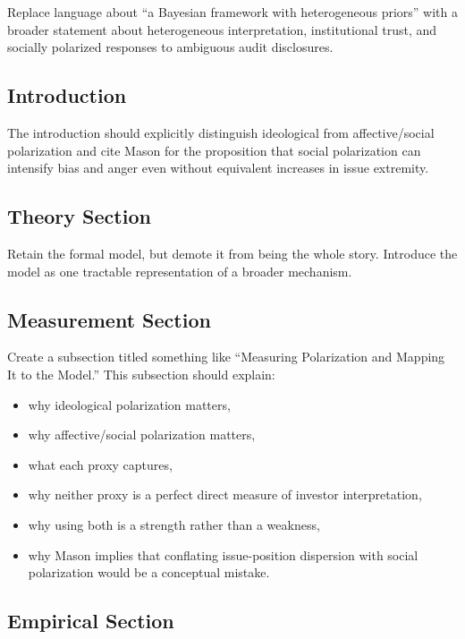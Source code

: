 \documentclass[12pt]{article}
\begin{document}
Replace language about ``a Bayesian framework with heterogeneous priors'' with a broader statement about heterogeneous interpretation, institutional trust, and socially polarized responses to ambiguous audit disclosures.

\subsection{Introduction}

The introduction should explicitly distinguish ideological from affective/social polarization and cite Mason for the proposition that social polarization can intensify bias and anger even without equivalent increases in issue extremity.

\subsection{Theory Section}

Retain the formal model, but demote it from being the whole story. Introduce the model as one tractable representation of a broader mechanism.

\subsection{Measurement Section}

Create a subsection titled something like ``Measuring Polarization and Mapping It to the Model.'' This subsection should explain:

\begin{itemize}
    \item why ideological polarization matters,
    \item why affective/social polarization matters,
    \item what each proxy captures,
    \item why neither proxy is a perfect direct measure of investor interpretation,
    \item why using both is a strength rather than a weakness,
    \item why Mason implies that conflating issue-position dispersion with social polarization would be a conceptual mistake.
\end{itemize}

\subsection{Empirical Section}
\end{document}

